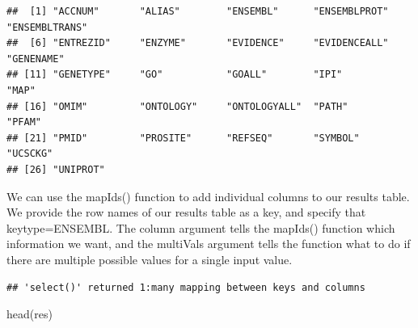 \documentclass[
]{article}
\newenvironment{Shaded}{\begin{snugshade}}{\end{snugshade}}
\newcommand{\AttributeTok}[1]{\textcolor[rgb]{0.77,0.63,0.00}{#1}}
\newcommand{\FunctionTok}[1]{\textcolor[rgb]{0.00,0.00,0.00}{#1}}
\newcommand{\NormalTok}[1]{#1}
\newcommand{\OtherTok}[1]{\textcolor[rgb]{0.56,0.35,0.01}{#1}}
\newcommand{\SpecialCharTok}[1]{\textcolor[rgb]{0.00,0.00,0.00}{#1}}
\newcommand{\StringTok}[1]{\textcolor[rgb]{0.31,0.60,0.02}{#1}}
\begin{document}
\begin{verbatim}
##  [1] "ACCNUM"       "ALIAS"        "ENSEMBL"      "ENSEMBLPROT"  "ENSEMBLTRANS"
##  [6] "ENTREZID"     "ENZYME"       "EVIDENCE"     "EVIDENCEALL"  "GENENAME"    
## [11] "GENETYPE"     "GO"           "GOALL"        "IPI"          "MAP"         
## [16] "OMIM"         "ONTOLOGY"     "ONTOLOGYALL"  "PATH"         "PFAM"        
## [21] "PMID"         "PROSITE"      "REFSEQ"       "SYMBOL"       "UCSCKG"      
## [26] "UNIPROT"
\end{verbatim}

We can use the mapIds() function to add individual columns to our
results table. We provide the row names of our results table as a key,
and specify that keytype=ENSEMBL. The column argument tells the mapIds()
function which information we want, and the multiVals argument tells the
function what to do if there are multiple possible values for a single
input value.

\begin{Shaded}
\end{Shaded}

\begin{verbatim}
## 'select()' returned 1:many mapping between keys and columns
\end{verbatim}

\begin{Shaded}
\begin{Highlighting}[]
\FunctionTok{head}\NormalTok{(res)}
\end{Highlighting}
\end{Shaded}
\end{document}
